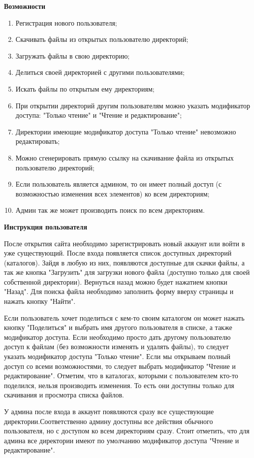 \documentclass[12pt,a4paper]{article}
\begin{document}
\begin{center}
   \Large{\bf Возможности } 
\end{center}

\begin{enumerate}
\item Регистрация нового пользователя;
\item Скачивать файлы из открытых пользователю директорий;
\item Загружать файлы в свою директорию;
\item Делиться своей директорией с другими пользователями;
\item Искать файлы по открытым ему директориям;
\item При открытии директорий другим пользователям можно указать модификатор доступа: "Только чтение" и "Чтение и редактирование";
\item Директории имеющие модификатор доступа "Только чтение" невозможно редактировать;
\item Можно сгенерировать прямую ссылку на скачивание файла из открытых пользователю директорий;
\item Если пользователь является админом, то он имеет полный доступ (с возможностью изменения всех элементов) ко всем директориям;
\item Админ так же может производить поиск по всем директориям.
\end{enumerate}

\newpage
\begin{center}
   \Large{\bf Инструкция пользователя } 
\end{center}

После открытия сайта необходимо зарегистрировать новый аккаунт или войти в уже существующий. После входа появляется список доступных директорий (каталогов). Зайдя в любую из них, появляются доступные для скачки файлы, а так же кнопка "Загрузить" для загрузки нового файла (доступно только для своей собственной директории). Вернуться назад можно будет нажатием кнопки "Назад". Для поиска файла необходимо заполнить форму вверху страницы и нажать кнопку "Найти".

Если пользователь хочет поделиться с кем-то своим каталогом он может нажать кнопку "Поделиться" и выбрать имя другого пользователя в списке, а также модификатор доступа. Если необходимо просто дать другому пользователю доступ к файлам (без возможности изменять и удалять файлы), то следует указать модификатор доступа "Только чтение". Если мы открываем полный доступ со всеми возможностями, то следует выбрать модификатор "Чтение и редактирование".  Отметим, что в каталогах, которыми с пользователем кто-то поделился, нельзя производить изменения. То есть они доступны только для скачивания и просмотра списка файлов.

У админа после входа в аккаунт появляются сразу все существующие директории.Соответственно админу доступны все действия обычного пользователя, но с доступом ко всем директориям сразу. Стоит отметить, что для админа все директории имеют по умолчанию модификатор доступа "Чтение и редактирование". 
\end{document}
